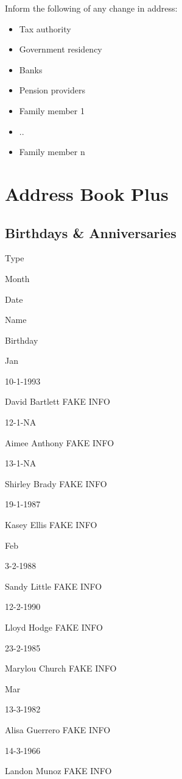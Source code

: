 \documentclass[]{book}
\providecommand{\tightlist}{%
  \setlength{\itemsep}{0pt}\setlength{\parskip}{0pt}}
\theoremstyle{definition}
\theoremstyle{definition}
\theoremstyle{definition}
\theoremstyle{remark}
\begin{document}
Inform the following of any change in address:

\begin{itemize}
\tightlist
\item
  Tax authority
\item
  Government residency
\item
  Banks
\item
  Pension providers
\item
  Family member 1
\item
  ..
\item
  Family member n
\end{itemize}

\chapter{Address Book Plus}\label{address-book-plus}

\section{Birthdays \& Anniversaries}\label{birthdays-anniversaries}

Type

Month

Date

Name

Birthday

Jan

10-1-1993

David Bartlett FAKE INFO

12-1-NA

Aimee Anthony FAKE INFO

13-1-NA

Shirley Brady FAKE INFO

19-1-1987

Kasey Ellis FAKE INFO

Feb

3-2-1988

Sandy Little FAKE INFO

12-2-1990

Lloyd Hodge FAKE INFO

23-2-1985

Marylou Church FAKE INFO

Mar

13-3-1982

Alisa Guerrero FAKE INFO

14-3-1966

Landon Munoz FAKE INFO
\end{document}

